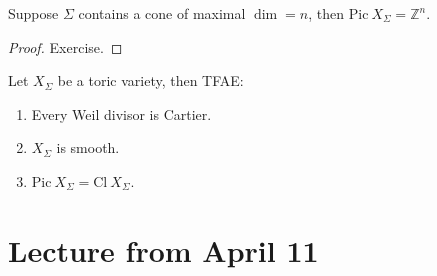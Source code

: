 \documentclass[a4paper,12pt]{amsart}
\newcommand{\ZZ}{\mathbb{Z}}
\begin{document}
\begin{proposition}
	Suppose $\Sigma$ contains a cone of maximal $\dim=n$, then $\mathrm{Pic}~X_\Sigma=\ZZ^n$. 
\end{proposition}
\begin{proof}
	Exercise.
\end{proof}

\begin{theorem}
	Let $X_\Sigma$ be a toric variety, then TFAE:
	\begin{enumerate}
		\item Every Weil divisor is Cartier.
		\item $X_\Sigma$ is smooth.
		\item $\mathrm{Pic}~X_\Sigma=\mathrm{Cl}~X_\Sigma$.
	\end{enumerate}
\end{theorem}
\newpage
\section{Lecture from April 11}
\end{document}
